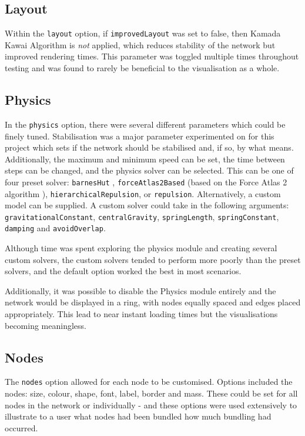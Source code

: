 \documentclass[../dissertation.tex]{subfiles}
\begin{document}
\subsection{Layout}

Within the \texttt{layout} \cite{visjslayout} option, if \texttt{improvedLayout} was set to false, then Kamada Kawai Algorithm \cite{kamada1989algorithm} is \emph{not} applied, which reduces stability of the network but improved rendering times. This parameter was toggled multiple times throughout testing and was found to rarely be beneficial to the visualisation as a whole.

\subsection{Physics}

In the \texttt{physics} \cite{visjsphysics} option, there were several different parameters which could be finely tuned. Stabilisation was a major parameter experimented on for this project which sets if the network should be stabilised and, if so, by what means. Additionally, the maximum and minimum speed can be set, the time between steps can be changed, and the physics solver can be selected. This can be one of four preset solver: \texttt{barnesHut} \cite{barnes1986hierarchical}, \texttt{forceAtlas2Based} (based on the Force Atlas 2 algorithm \cite{jacomy2014forceatlas2}), \texttt{hierarchicalRepulsion}, or \texttt{repulsion}. Alternatively, a custom model can be supplied. A custom solver could take in the following arguments: \texttt{gravitationalConstant}, \texttt{centralGravity}, \texttt{springLength}, \texttt{springConstant}, \texttt{damping} and \texttt{avoidOverlap}. 

Although time was spent exploring the physics module and creating several custom solvers, the custom solvers tended to perform more poorly than the preset solvers, and the default option worked the best in most scenarios. 

Additionally, it was possible to disable the Physics module entirely and the network would be displayed in a ring, with nodes equally spaced and edges placed appropriately. This lead to near instant loading times but the visualisations becoming meaningless.

\subsection{Nodes}

The \texttt{nodes} option allowed for each node to be customised. Options included the nodes: size, colour, shape, font, label, border and mass. These could be set for all nodes in the network or individually - and these options were used extensively to illustrate to a user what nodes had been bundled how much bundling had occurred.
\end{document}
